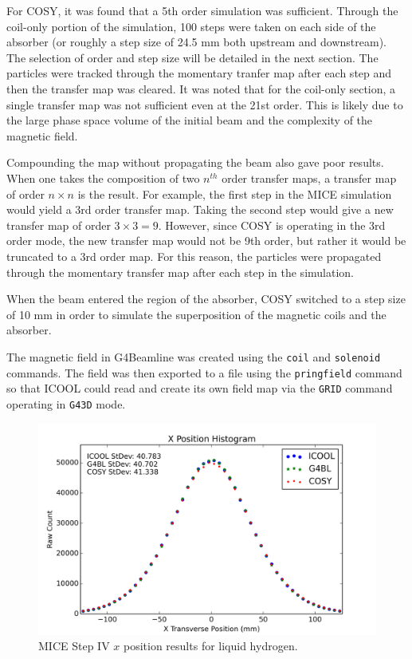 For COSY, it was found that a 5th order simulation was sufficient. Through the coil-only portion of the simulation, 100 steps were taken on each side of the absorber (or roughly a step size of 24.5 mm both upstream and downstream). The selection of order and step size will be detailed in the next section. The particles were tracked through the momentary tranfer map after each step and then the transfer map was cleared. It was noted that for the coil-only section, a single transfer map was not sufficient even at the 21st order. This is likely due to the large phase space volume of the initial beam and the complexity of the magnetic field.

Compounding the map without propagating the beam also gave poor results. When one takes the composition of two $n^{th}$ order transfer maps, a transfer map of order $n\times n$ is the result. For example, the first step in the MICE simulation would yield a 3rd order transfer map. Taking the second step would give a new transfer map of order $3\times 3 = 9$. However, since COSY is operating in the 3rd order mode, the new transfer map would not be 9th order, but rather it would be truncated to a 3rd order map. For this reason, the particles were propagated through the momentary transfer map after each step in the simulation.

When the beam entered the region of the absorber, COSY switched to a step size of 10 mm in order to simulate the superposition of the magnetic coils and the absorber.

The magnetic field in G4Beamline was created using the \texttt{coil} and \texttt{solenoid} commands. The field was then exported to a file using the \texttt{pringfield} command so that ICOOL could read and create its own field map via the \texttt{GRID} command operating in \texttt{G43D} mode.

\begin{figure}[H]
  \centering
    \includegraphics[width=\textwidth]{MICE data/x} 
  \caption{MICE Step IV $x$ position results for liquid hydrogen.}
  \label{fig:micex}
\end{figure}

